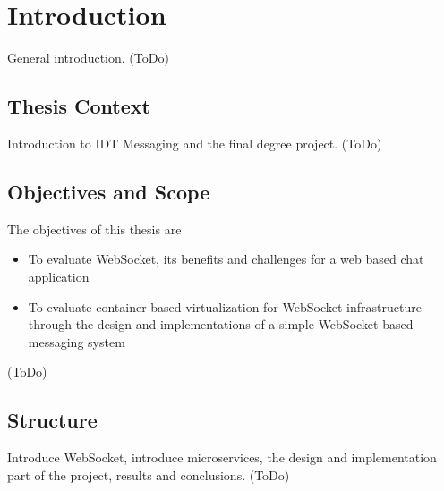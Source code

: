 \chapter{Introduction}
\label{chapter:intro}

General introduction. (ToDo)

\section{Thesis Context}

Introduction to IDT Messaging and the final degree project. (ToDo)

\section{Objectives and Scope}

The objectives of this thesis are

\begin{itemize}
\item To evaluate WebSocket, its benefits and challenges for a web based chat application
\item To evaluate container-based virtualization for WebSocket infrastructure through the design and implementations of a simple WebSocket-based messaging system
\end{itemize}

(ToDo)

\section{Structure}

Introduce WebSocket, introduce microservices, the design and implementation part of the project, results and conclusions. (ToDo)
